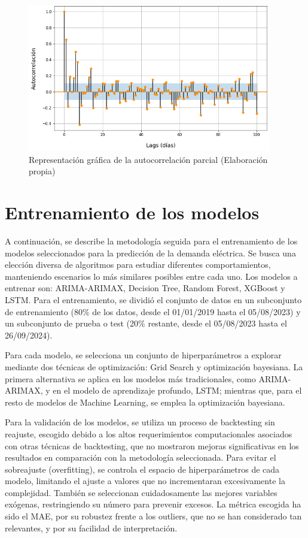 \documentclass[12pt,a4paper]{report}
\begin{document}
\begin{figure}[H]
    \centering
    \includegraphics[width=0.95\textwidth]{Images/tfm-3.7B.png}
    \caption{Representación gráfica de la autocorrelación parcial (Elaboración propia)}
    \label{fig:autocp}
\end{figure}

\section{Entrenamiento de los modelos}

A continuación, se describe la metodología seguida para el entrenamiento de los modelos seleccionados para la predicción de la demanda eléctrica. Se busca una elección diversa de algoritmos para estudiar diferentes comportamientos, manteniendo escenarios lo más similares posibles entre cada uno. Los modelos a entrenar son: ARIMA-ARIMAX, Decision Tree, Random Forest, XGBoost y LSTM. Para el entrenamiento, se dividió el conjunto de datos en un subconjunto de entrenamiento (80$\%$ de los datos, desde el 01/01/2019 hasta el 05/08/2023) y un subconjunto de prueba o test (20$\%$ restante, desde el 05/08/2023 hasta el 26/09/2024).

Para cada modelo, se selecciona un conjunto de hiperparámetros a explorar mediante dos técnicas de optimización: Grid Search y optimización bayesiana. La primera alternativa se aplica en los modelos más tradicionales, como ARIMA-ARIMAX, y en el modelo de aprendizaje profundo, LSTM; mientras que, para el resto de modelos de Machine Learning, se emplea la optimización bayesiana.

Para la validación de los modelos, se utiliza un proceso de backtesting sin reajuste, escogido debido a los altos requerimientos computacionales asociados con otras técnicas de backtesting, que no mostraron mejoras significativas en los resultados en comparación con la metodología seleccionada. Para evitar el sobreajuste (overfitting), se controla el espacio de hiperparámetros de cada modelo, limitando el ajuste a valores que no incrementaran excesivamente la complejidad. También se seleccionan cuidadosamente las mejores variables exógenas, restringiendo su número para prevenir excesos. La métrica escogida ha sido el MAE, por su robustez frente a los outliers, que no se han considerado tan relevantes, y por su facilidad de interpretación.
\end{document}
